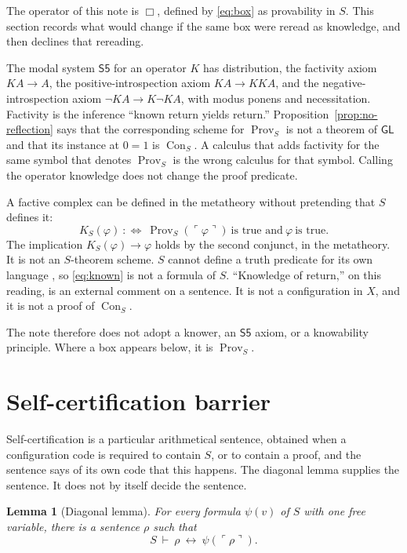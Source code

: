 \documentclass[11pt]{article}
\newcommand{\gn}[1]{\ulcorner #1 \urcorner}
\DeclareMathOperator{\Prov}{Prov}
\DeclareMathOperator{\Con}{Con}
\newcommand{\GL}{\mathsf{GL}}
\newtheorem{lemma}[theorem]{Lemma}
\theoremstyle{definition}
\theoremstyle{remark}
\begin{document}
The operator of this note is \(\Box\), defined by \eqref{eq:box} as provability in \(S\).
This section records what would change if the same box were reread as knowledge, and then declines that rereading.

The modal system \(\mathsf{S5}\) for an operator \(K\) has distribution, the factivity axiom \(KA\to A\), the positive-introspection axiom \(KA\to KKA\), and the negative-introspection axiom \(\neg KA\to K\neg KA\), with modus ponens and necessitation.
Factivity is the inference ``known return yields return.''
Proposition~\ref{prop:no-reflection} says that the corresponding scheme for \(\Prov_{S}\) is not a theorem of \(\GL\) and that its instance at \(0=1\) is \(\Con_{S}\).
A calculus that adds factivity for the same symbol that denotes \(\Prov_{S}\) is the wrong calculus for that symbol.
Calling the operator knowledge does not change the proof predicate.

A factive complex can be defined in the metatheory without pretending that \(S\) defines it:
\begin{equation}
\label{eq:known}
K_{S}(\varphi)\ :\Longleftrightarrow\ \Prov_{S}(\gn{\varphi})\ \text{is true and}\ \varphi\ \text{is true}.
\end{equation}
The implication \(K_{S}(\varphi)\to\varphi\) holds by the second conjunct, in the metatheory.
It is not an \(S\)-theorem scheme.
\(S\) cannot define a truth predicate for its own language \citep{tarski1936}, so \eqref{eq:known} is not a formula of \(S\).
``Knowledge of return,'' on this reading, is an external comment on a sentence.
It is not a configuration in \(X\), and it is not a proof of \(\Con_{S}\).

The note therefore does not adopt a knower, an \(\mathsf{S5}\) axiom, or a knowability principle.
Where a box appears below, it is \(\Prov_{S}\).

\section{Self-certification barrier}
\label{sec:barrier}

Self-certification is a particular arithmetical sentence, obtained when a configuration code is required to contain \(S\), or to contain a proof, and the sentence says of its own code that this happens.
The diagonal lemma supplies the sentence.
It does not by itself decide the sentence.

\begin{lemma}[Diagonal lemma]
\label{lem:diag}
For every formula \(\psi(v)\) of \(S\) with one free variable, there is a sentence \(\rho\) such that
\[
S\ \vdash\ \rho\ \leftrightarrow\ \psi(\gn{\rho}).
\]
\end{lemma}
\end{document}

